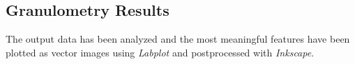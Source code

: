 \documentclass[a4paper]{article}
\begin{document}
    \clearpage

    \subsection{Granulometry Results\label{Granulometry_results}}
      
      The output data has been analyzed and the most meaningful features have been plotted as vector images using \textit{Labplot} and 
      postprocessed with \textit{Inkscape}. \\ 
  
\end{document}
